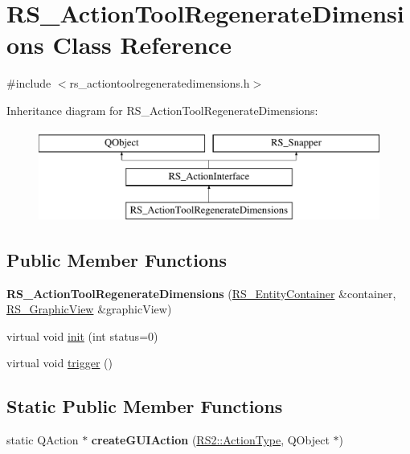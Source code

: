 \hypertarget{classRS__ActionToolRegenerateDimensions}{\section{R\-S\-\_\-\-Action\-Tool\-Regenerate\-Dimensions Class Reference}
\label{classRS__ActionToolRegenerateDimensions}
}


{\ttfamily \#include $<$rs\-\_\-actiontoolregeneratedimensions.\-h$>$}

Inheritance diagram for R\-S\-\_\-\-Action\-Tool\-Regenerate\-Dimensions\-:\begin{figure}[H]
\begin{center}
\leavevmode
\includegraphics[height=3.000000cm]{classRS__ActionToolRegenerateDimensions}
\end{center}
\end{figure}
\subsection*{Public Member Functions}
\begin{DoxyCompactItemize}
\item 
\hypertarget{classRS__ActionToolRegenerateDimensions_a2d3dc0faeaf28b0f0e90eab96cfb2af8}{{\bfseries R\-S\-\_\-\-Action\-Tool\-Regenerate\-Dimensions} (\hyperlink{classRS__EntityContainer}{R\-S\-\_\-\-Entity\-Container} \&container, \hyperlink{classRS__GraphicView}{R\-S\-\_\-\-Graphic\-View} \&graphic\-View)}\label{classRS__ActionToolRegenerateDimensions_a2d3dc0faeaf28b0f0e90eab96cfb2af8}

\item 
virtual void \hyperlink{classRS__ActionToolRegenerateDimensions_afb2ed623b4595113b7263bfe0a70dbe9}{init} (int status=0)
\item 
virtual void \hyperlink{classRS__ActionToolRegenerateDimensions_a44bdc8695914a90357c6090c37421bcb}{trigger} ()
\end{DoxyCompactItemize}
\subsection*{Static Public Member Functions}
\begin{DoxyCompactItemize}
\item 
\hypertarget{classRS__ActionToolRegenerateDimensions_a4322ff1a70eb03c5f63a5a80f3112036}{static Q\-Action $\ast$ {\bfseries create\-G\-U\-I\-Action} (\hyperlink{classRS2_afe3523e0bc41fd637b892321cfc4b9d7}{R\-S2\-::\-Action\-Type}, Q\-Object $\ast$)}\label{classRS__ActionToolRegenerateDimensions_a4322ff1a70eb03c5f63a5a80f3112036}

\end{DoxyCompactItemize}
